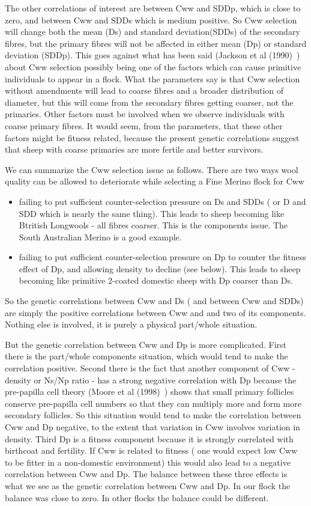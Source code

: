 \documentclass[titlepage]{article}  %
\begin{document}
The other correlations of interest are between Cww and SDDp, which is close to zero, and between Cww and SDDs which is medium positive. So Cww selection will change both the mean (Ds) and standard deviation(SDDs) of the secondary fibres, but the primary fibres will not be affected in either mean (Dp) or standard deviation (SDDp).  This goes against what has been said (Jackson et al (1990)~\cite{jack:90}) about Cww selection possibly being one of the factors which can cause primitive individuals to appear in a flock.  What the parameters say is that Cww selection without amendments will lead to coarse fibres and a broader distribution of diameter, but this will come from the secondary fibres getting coarser, not the primaries. Other factors must be involved when we observe individuals with coarse primary fibres. It would seem, from the parameters, that these other factors might be fitness related, because the present genetic correlations suggest that sheep with coarse primaries are more fertile and better survivors.

We can summarize the Cww selection issue as follows. There are two ways wool quality can be allowed to deteriorate while selecting a Fine Merino flock for Cww
\begin{itemize}
\item  failing to put sufficient counter-selection pressure on Ds and SDDs ( or D and SDD which is nearly the same thing). This leads to sheep becoming like Btritish Longwools - all fibres coarser. This is the components issue. The South Australian Merino is a good example.
\item failing to put sufficient counter-selection pressure on Dp to counter the fitness effect of Dp, and allowing density to decline (see below). This leads to sheep becoming like primitive 2-coated domestic sheep with Dp coarser than Ds. 
\end{itemize}

So the genetic correlations between Cww and Ds ( and between Cww and SDDs) are simply the positive correlations between Cww and and two of its components. Nothing else is involved, it is purely a physical part/whole situation.

But the genetic correlation between Cww and Dp is more complicated. First there is the part/whole components situation, which would tend to make the correlation positive. Second there is the fact that another component of Cww - density or Ns/Np ratio - has a strong negative correlation with Dp because the pre-papilla cell theory (Moore et al (1998)~\cite{moor:98}) shows that small primary follicles conserve pre-papilla cell numbers so that they can multiply more and form more secondary follicles. So this situation would tend to make the correlation between Cww and Dp negative, to the extent that variation in Cww involves variation in density. Third Dp is a fitness component because it is strongly correlated with birthcoat and fertility. If Cww is related to fitness ( one would expect low Cww to be fitter in a non-domestic environment) this would also lead to a negative correlation between Cww and Dp. The balance between these three effects is what we see as the genetic correlation between Cww and Dp. In our flock the balance was close to zero. In other flocks the balance could be different.
\end{document}

